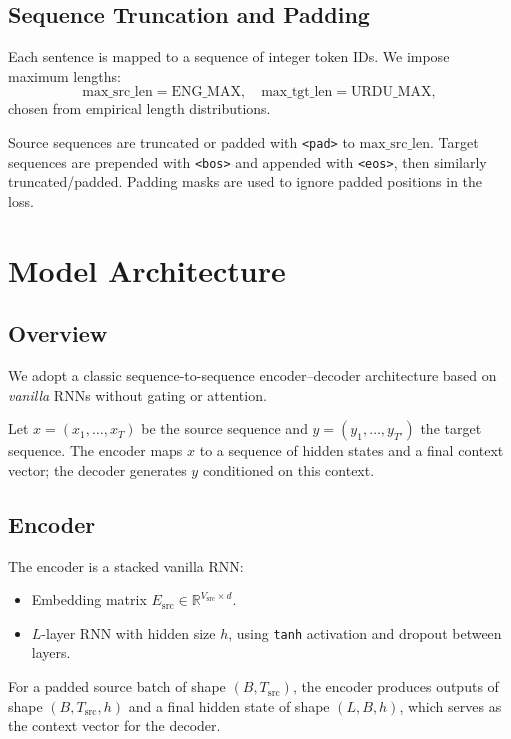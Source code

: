\documentclass[runningheads]{llncs}
\begin{document}
\subsection{Sequence Truncation and Padding}
Each sentence is mapped to a sequence of integer token IDs.
We impose maximum lengths:
\[
\text{max\_src\_len} = \text{ENG\_MAX},\quad
\text{max\_tgt\_len} = \text{URDU\_MAX},
\]
chosen from empirical length distributions.

Source sequences are truncated or padded with \texttt{\textless pad\textgreater} to \(\text{max\_src\_len}\).
Target sequences are prepended with \texttt{\textless bos\textgreater} and appended with \texttt{\textless eos\textgreater}, then similarly truncated/padded.
Padding masks are used to ignore padded positions in the loss.

\section{Model Architecture}
\subsection{Overview}
We adopt a classic sequence-to-sequence encoder--decoder architecture based on \emph{vanilla} RNNs without gating or attention.

Let \(x = (x_1,\dots,x_T)\) be the source sequence and \(y=(y_1,\dots,y_{T'})\) the target sequence.
The encoder maps \(x\) to a sequence of hidden states and a final context vector; the decoder generates \(y\) conditioned on this context.

\subsection{Encoder}
The encoder is a stacked vanilla RNN:
\begin{itemize}
    \item Embedding matrix \(E_{\text{src}} \in \mathbb{R}^{V_{\text{src}}\times d}\).
    \item \(L\)-layer RNN with hidden size \(h\), using \texttt{tanh} activation and dropout between layers.
\end{itemize}
For a padded source batch of shape \((B, T_{\text{src}})\), the encoder produces outputs of shape \((B, T_{\text{src}}, h)\) and a final hidden state of shape \((L, B, h)\), which serves as the context vector for the decoder.
\end{document}
